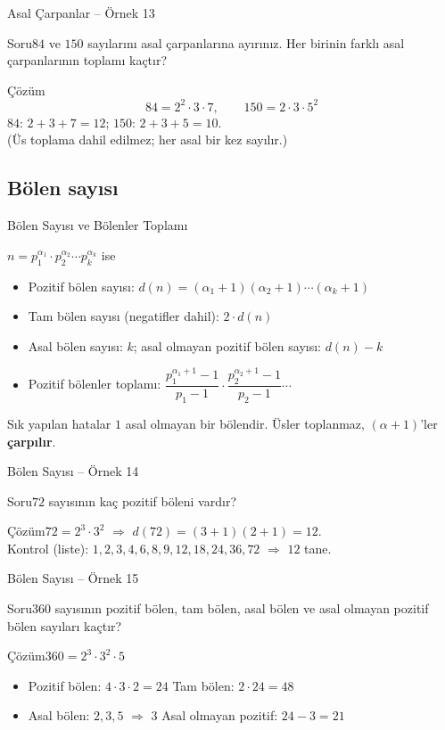 \documentclass[aspectratio=169,11pt,handout]{beamer}
\newcommand{\soru}[3]{%
\begin{frame}{#1}
  \begin{block}{Soru}\large #2\end{block}
  \pause
  \begin{exampleblock}{Çözüm}\large #3\end{exampleblock}
\end{frame}}
\begin{document}
\soru{Asal Çarpanlar -- Örnek 13}
{\(84\) ve \(150\) sayılarını asal çarpanlarına ayırınız. Her birinin farklı asal çarpanlarının toplamı kaçtır?}
{\[84=2^2\cdot 3\cdot 7,\qquad 150=2\cdot 3\cdot 5^2\]
\(84\): \(2+3+7=12\); \qquad \(150\): \(2+3+5=10\).\\[3pt]
(Üs toplama dahil edilmez; her asal bir kez sayılır.)}

\subsection{Bölen sayısı}
\begin{frame}{Bölen Sayısı ve Bölenler Toplamı}
\begin{block}{\(n=p_1^{\alpha_1}\cdot p_2^{\alpha_2}\cdots p_k^{\alpha_k}\) ise}
\begin{itemize}
\item Pozitif bölen sayısı: \(d(n)=(\alpha_1+1)(\alpha_2+1)\cdots(\alpha_k+1)\)
\item Tam bölen sayısı (negatifler dahil): \(2\cdot d(n)\)
\item Asal bölen sayısı: \(k\); \quad asal olmayan pozitif bölen sayısı: \(d(n)-k\)
\item Pozitif bölenler toplamı: \(\dfrac{p_1^{\alpha_1+1}-1}{p_1-1}\cdot\dfrac{p_2^{\alpha_2+1}-1}{p_2-1}\cdots\)
\end{itemize}
\end{block}
\begin{alertblock}{Sık yapılan hatalar}
\(1\) asal olmayan bir bölendir. \quad Üsler toplanmaz, \((\alpha+1)\)'ler \textbf{çarpılır}.
\end{alertblock}
\end{frame}

\soru{Bölen Sayısı -- Örnek 14}
{\(72\) sayısının kaç pozitif böleni vardır?}
{\(72=2^3\cdot 3^2\) \(\Rightarrow\) \(d(72)=(3+1)(2+1)=12\).\\[3pt]
Kontrol (liste): \(1,2,3,4,6,8,9,12,18,24,36,72\) \(\Rightarrow\) \(12\) tane.}

\soru{Bölen Sayısı -- Örnek 15}
{\(360\) sayısının pozitif bölen, tam bölen, asal bölen ve asal olmayan pozitif bölen sayıları kaçtır?}
{\(360=2^3\cdot 3^2\cdot 5\)
\begin{itemize}
\item Pozitif bölen: \(4\cdot 3\cdot 2=24\) \quad Tam bölen: \(2\cdot 24=48\)
\item Asal bölen: \(2,3,5\) \(\Rightarrow\) \(3\) \quad Asal olmayan pozitif: \(24-3=21\)
\end{itemize}}
\end{document}
